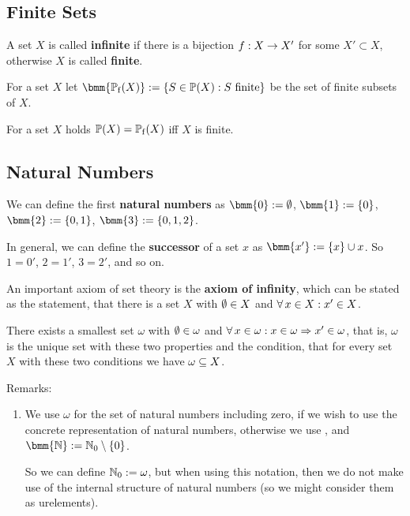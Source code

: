 \documentclass[12pt]{book}
\begin{document}
\subsection{Finite Sets}
\label{sec:Finite sets}

\begin{defi}\label{def:finite}
  A set $X$ is called \textbf{infinite} if there is a bijection $f: X \rightarrow X'$ for some $X' \subset X$, otherwise $X$ is called \textbf{finite}.
\end{defi}

\begin{defi}\label{def:finitesubs}
  For a set $X$ let $\bmm{\pote(X)} := \set{S \in \pot(X) : S \text{ finite}}$ be the set of finite subsets of $X$.
\end{defi}

\begin{lem}\label{lem:finitesubs}
  For a set $X$ holds $\operatorname{\mathbb{P}}(X) = \operatorname{\mathbb{P}_f}(X)$ iff $X$ is finite.
\end{lem}


\subsection{Natural Numbers}
\label{sec:natnumbers}

\begin{defi}\label{def:natnumberssimple}
  We can define the first \textbf{natural numbers} as $\bmm{0} := \es$, $\bmm{1} := \set{0}$, $\bmm{2} := \set{0,1}$, $\bmm{3} := \set{0,1,2}$.

  In general, we can define the \textbf{successor} of a set $x$ as $\bmm{x'} := \set{x} \cup x$. So $1 = 0'$, $2 = 1'$, $3 = 2'$, and so on.

  An important axiom of set theory is the \textbf{axiom of infinity}, which can be stated as the statement, that there is a set $X$ with $\emptyset \in X$ and $\forall\, x \in X : x' \in X$.
\end{defi}

\begin{lem}\label{lem:omega}
  There exists a smallest set $\omega$ with $\emptyset \in \omega$ and $\forall\, x \in \omega : x \in \omega \Rightarrow x' \in \omega$, that is, $\omega$ is the unique set with these two properties and the condition, that for every set $X$ with these two conditions we have $\omega \subseteq X$.
\end{lem}
Remarks:
\begin{enumerate}
\item We use $\omega$ for the set of natural numbers including zero, if we wish to use the concrete representation of natural numbers, otherwise we use \bmm{\NNZ}, and $\bmm{\NN} := \NNZ \sm \set{0}$.

  So we can define $\mathbb{N}_0 := \omega$, but when using this notation, then we do not make use of the internal structure of natural numbers (so we might consider them as urelements).
\end{enumerate}
\end{document}
